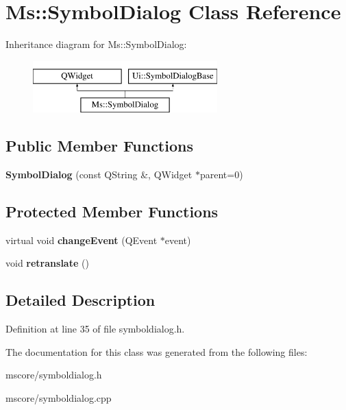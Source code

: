 \hypertarget{class_ms_1_1_symbol_dialog}{}\section{Ms\+:\+:Symbol\+Dialog Class Reference}
\label{class_ms_1_1_symbol_dialog}
Inheritance diagram for Ms\+:\+:Symbol\+Dialog\+:\begin{figure}[H]
\begin{center}
\leavevmode
\includegraphics[height=2.000000cm]{class_ms_1_1_symbol_dialog}
\end{center}
\end{figure}
\subsection*{Public Member Functions}
\begin{DoxyCompactItemize}
\item 
\mbox{\label{class_ms_1_1_symbol_dialog_a8ff79afe69da3d7c1a8ae57707ba2002}} 
{\bfseries Symbol\+Dialog} (const Q\+String \&, Q\+Widget $\ast$parent=0)
\end{DoxyCompactItemize}
\subsection*{Protected Member Functions}
\begin{DoxyCompactItemize}
\item 
\mbox{\label{class_ms_1_1_symbol_dialog_abaa67a7ae981cb0afcc1bcb17baed342}} 
virtual void {\bfseries change\+Event} (Q\+Event $\ast$event)
\item 
\mbox{\label{class_ms_1_1_symbol_dialog_aef2774a9a6f03710a9b965ce3b98cbf8}} 
void {\bfseries retranslate} ()
\end{DoxyCompactItemize}


\subsection{Detailed Description}


Definition at line 35 of file symboldialog.\+h.



The documentation for this class was generated from the following files\+:\begin{DoxyCompactItemize}
\item 
mscore/symboldialog.\+h\item 
mscore/symboldialog.\+cpp\end{DoxyCompactItemize}
